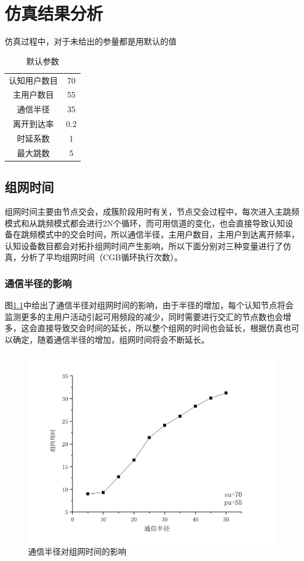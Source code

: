 \documentclass[a4paper,AutoFakeBold,oneside,12pt]{book}
\begin{document}
\chapter{仿真结果分析}
  仿真过程中，对于未给出的参量都是用默认的值
  \begin{table}[h]
  \setlength{\belowcaptionskip}{7pt}
  \centering
  \caption{默认参数}
 
  \begin{tabular}{cc} 
  认知用户数目&70\\
  主用户数目&55\\
  通信半径&35\\
  离开到达率&0.2\\
  时延系数&1\\
  最大跳数&5
  \end{tabular}
  \end{table}
  \section{组网时间}
   组网时间主要由节点交会，成簇阶段用时有关，节点交会过程中，每次进入主跳频模式和从跳频模式都会进行2N个循环，而可用信道的变化，也会直接导致认知设备在跳频模式中的交会时间，所以通信半径，主用户数目，主用户到达离开频率，认知设备数目都会对拓扑组网时间产生影响，所以下面分别对三种变量进行了仿真，分析了平均组网时间（CGB循环执行次数）。
  \subsection{通信半径的影响}
  图\ref{data-1R}中给出了通信半径对组网时间的影响，由于半径的增加，每个认知节点将会监测更多的主用户活动引起可用频段的减少，同时需要进行交汇的节点数也会增多，这会直接导致交会时间的延长，所以整个组网的时间也会延长，根据仿真也可以确定，随着通信半径的增加，组网时间将会不断延长。
   \begin{figure}[htbp]
\centering %
\includegraphics[scale=0.2]{pictures/data-1R.png} 
\caption{通信半径对组网时间的影响 } %
\label{data-1R}
\end{figure}
 
\end{document}

